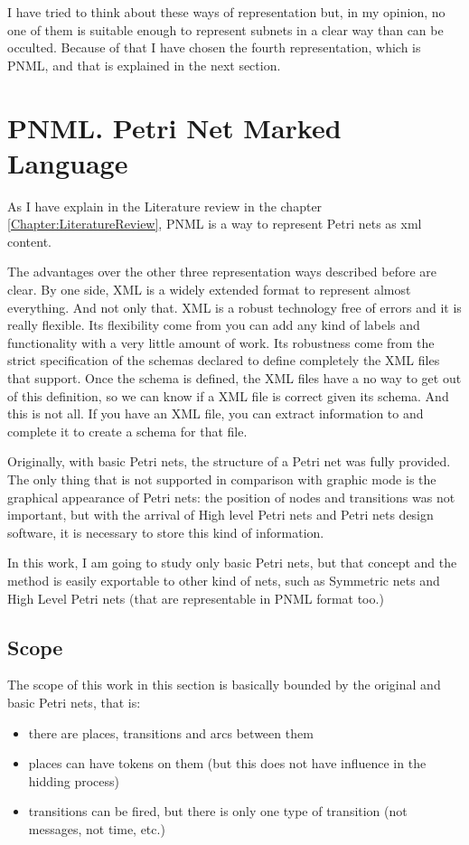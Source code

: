 I have tried to think about these ways of representation but, in my opinion, no one of them is suitable enough to represent subnets in a clear way than can be occulted. Because of that I have chosen the fourth representation, which is PNML, and that is explained in the next section. 

\section{PNML. Petri Net Marked Language}

As I have explain in the Literature review in the chapter \ref{Chapter:LiteratureReview},
 PNML is a way to represent Petri nets as xml content.

The advantages over the other three representation ways described before
are clear. By one side, XML is a widely extended format to represent almost
everything. And not only that. XML is a robust technology free of errors
and it is really flexible. Its flexibility come from you can add any kind
of labels and functionality with a very little amount of work. Its robustness come from the strict
specification of the schemas declared to define completely the XML files    
that support. Once
the schema is defined, the XML files have a no way to get out of this definition,
so we can know if a XML file is correct given its schema. And this is not all. If you have an XML file, you can extract information to and complete it to create a schema for that file.  



Originally, with basic Petri nets, the structure of a Petri net was fully provided.
The only thing that is not supported in comparison with graphic mode is the graphical appearance of Petri nets: the position of nodes and
transitions was not
important, but with the arrival of High level Petri nets and Petri nets design
software, it is necessary to store this kind of information.

In this work, I am going to study only basic Petri nets, but
that concept and the method is easily exportable to other kind of nets, such as Symmetric nets and High Level Petri nets (that are representable in PNML
format too.)

\subsection{Scope}
The scope of this work in this section is basically bounded by the original
and basic Petri nets, that is:
\begin{itemize}
\item there are places, transitions and arcs between them
\item places can have tokens on them (but this does not have influence in
the hidding process)
\item transitions can be fired, but there is only one type of transition
(not messages, not time, etc.)
\end{itemize}

